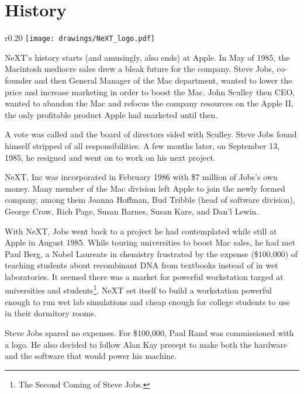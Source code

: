 \section{History}

\begin{wrapfigure}[8]{r}{0.20\textwidth}
\centering
\texttt{[image: drawings/NeXT\_logo.pdf]}
\end{wrapfigure}
\par
NeXT's history starts (and amusingly, also ends) at Apple. In May of 1985, the Macintosh mediocre sales drew a bleak future for the company. Steve Jobs, co-founder and then General Manager of the Mac department, wanted to lower the price and increase marketing in order to boost the Mac. John Sculley then CEO, wanted to abandon the Mac and refocus the company resources on the Apple II, the only profitable product Apple had marketed until then.\\
\par
 A vote was called and the board of directors sided with Sculley. Steve Jobs found himself stripped of all responsibilities. A few months later, on September 13, 1985, he resigned and went on to work on his next project.\\
\par
NeXT, Inc was incorporated in February 1986 with \$7 million of Jobs's own money. Many member of the Mac division left Apple to join the newly formed company, among them  Joanna Hoffman, Bud Tribble (head of software division), George Crow, Rich Page, Susan Barnes, Susan Kare, and Dan'l  Lewin.\\ 
\par
With NeXT, Jobs went back to a project he had contemplated while still at Apple in August 1985. While touring universities to boost Mac sales, he had met Paul Berg, a Nobel Laureate in chemistry frustrated by the expense (\$100,000) of teaching students about recombinant DNA from textbooks instead of in wet laboratories. It seemed there was a market for powerful workstation targed at universities and students\footnote{The Second Coming of Steve Jobs.}. NeXT set itself to build a workstation powerful enough to run wet lab simulations and cheap enough for college students to use in their dormitory rooms.\\
\par
{}
\par
Steve Jobs spared no expenses. For \$100,000, Paul Rand was commissioned with a logo. He also decided to follow Alan Kay precept to make both the hardware and the software that would power his machine.\\
